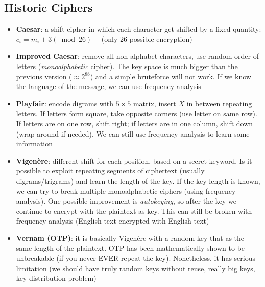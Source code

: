 \subsection{Historic Ciphers}
\begin{itemize}
    \item \textbf{Caesar}: a shift cipher in which each character get shifted by a fixed quantity: $c_i=m_i+3 (\bmod 26)\hspace{1em}$ (only 26 possible encryption)
    \item \textbf{Improved Caesar}: remove all non-alphabet characters, use random order of letters (\textit{monoalphabetic} cipher). The key space is much bigger than the previous version ($\approx 2^{88}$) and a simple bruteforce will not work. If we know the language of the message, we can use frequency analysis
    \item \textbf{Playfair}: encode digrams with $5\times 5$ matrix, insert $X$ in between repeating letters. If letters form square, take opposite corners (use letter on same row). If letters are on one row, shift right; if letters are in one column, shift down (wrap around if needed). We can still use frequency analysis to learn some information
    \item \textbf{Vigenère}: different shift for each position, based on a secret keyword. Is it possible to exploit repeating segments of ciphertext (usually digrams/trigrams) and learn the length of the key. If the key length is known, we can try to break multiple monoalphabetic ciphers (using frequency analysis). One possible improvement is \textit{autokeying}, so after the key we continue to encrypt with the plaintext as key. This can still be broken with frequency analysis (English text encrypted with English text)
    \item \textbf{Vernam (OTP)}: it is basically Vigenère with a random key that as the same length of the plaintext. OTP has been mathematically shown to be unbreakable (if you never EVER repeat the key). Nonetheless, it has serious limitation (we should have truly random keys without reuse, really big keys, key distribution problem)
\end{itemize}

